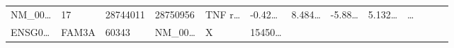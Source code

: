 \documentclass[
]{article}
\begin{document}
\begin{longtable}[]{@{}lllllllllllll@{}}
\begin{minipage}[t]{0.05\columnwidth}
NM\_00\ldots{}\strut
\end{minipage} & \begin{minipage}[t]{0.05\columnwidth}\raggedright
17\strut
\end{minipage} & \begin{minipage}[t]{0.05\columnwidth}\raggedright
28744011\strut
\end{minipage} & \begin{minipage}[t]{0.05\columnwidth}\raggedright
28750956\strut
\end{minipage} & \begin{minipage}[t]{0.05\columnwidth}\raggedright
TNF r\ldots{}\strut
\end{minipage} & \begin{minipage}[t]{0.05\columnwidth}\raggedright
-0.42\ldots{}\strut
\end{minipage} & \begin{minipage}[t]{0.05\columnwidth}\raggedright
8.484\ldots{}\strut
\end{minipage} & \begin{minipage}[t]{0.05\columnwidth}\raggedright
-5.88\ldots{}\strut
\end{minipage} & \begin{minipage}[t]{0.05\columnwidth}\raggedright
5.132\ldots{}\strut
\end{minipage} & \begin{minipage}[t]{0.02\columnwidth}\raggedright
\ldots{}\strut
\end{minipage}\tabularnewline
\begin{minipage}[t]{0.05\columnwidth}\raggedright
ENSG0\ldots{}\strut
\end{minipage} & \begin{minipage}[t]{0.05\columnwidth}\raggedright
FAM3A\strut
\end{minipage} & \begin{minipage}[t]{0.05\columnwidth}\raggedright
60343\strut
\end{minipage} & \begin{minipage}[t]{0.05\columnwidth}\raggedright
NM\_00\ldots{}\strut
\end{minipage} & \begin{minipage}[t]{0.05\columnwidth}\raggedright
X\strut
\end{minipage} & \begin{minipage}[t]{0.05\columnwidth}\raggedright
15450\ldots{}\strut
\end{minipage} & \begin{minipage}[t]{0.05\columnwidth}\raggedright

\end{minipage}
\end{longtable}
\end{document}
